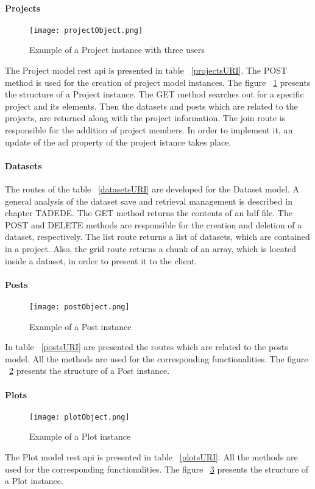 \paragraph{Projects}
\begin{figure}
	\texttt{[image: projectObject.png]}
	\caption{Example of a Project instance with three users}
	\label{projectObject}
\end{figure}
The Project model rest api is presented in table ~\ref{projectsURI}. The POST method is used for the creation of project model instances. The  figure ~\ref{projectObject} presents the structure of a Project instance. The GET method searches out for a specific project and its elements. Then the datasets and posts which are related to the projects, are returned along with the project information. The join route is responsible for the addition of project members. In order to implement it, an update of the acl property of the project istance takes place.

\paragraph{Datasets}
The routes of the table ~\ref{datasetsURI} are developed for the Dataset model. A general analysis of the dataset save and retrieval management is described in chapter TADEDE. The GET method returns the contents of an hdf file. The POST and DELETE methods are responsible for the creation and deletion of a dataset, respectively. The list route returns a list of datasets, which are contained in a project. Also, the grid route returns a chunk of an array, which is located inside a dataset, in order to present it to the client.

\paragraph{Posts}
\begin{figure}
	\texttt{[image: postObject.png]}
	\caption{Example of a Post instance}
	\label{postObject}
\end{figure}
In table ~\ref{postsURI} are presented the routes which are related to the posts model. All the methods are used for the corresponding functionalities. The figure ~\ref{postObject} presents the structure of a Post instance. 

\paragraph{Plots}
\begin{figure}
	\texttt{[image: plotObject.png]}
	\caption{Example of a Plot instance}
	\label{plotObject}
\end{figure}
The Plot model rest api is presented in table ~\ref{plotsURI}. All the methods are used for the corresponding functionalities. The figure ~\ref{plotObject} presents the structure of a Plot instance. 


